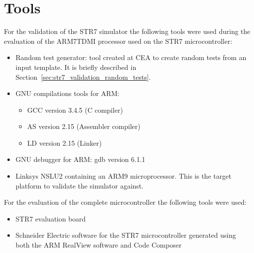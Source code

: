 \section{Tools}
\label{sec:str7_validation_tools}

For the validation of the STR7 simulator the following tools were used during the evaluation of the ARM7TDMI processor used on the STR7 microcontroller:
\begin{itemize}
	\item Random test generator: tool created at CEA to create random tests from an input template. It is briefly described in Section~\ref{sec:str7_validation_random_tests}.
	\item GNU compilations tools for ARM:
	\begin{itemize}
		\item GCC version 3.4.5 (C compiler)
		\item AS version 2.15 (Assembler compiler)
		\item LD version 2.15 (Linker)
	\end{itemize}
	\item GNU debugger for ARM: gdb version 6.1.1
	\item Linksys NSLU2 containing an ARM9 microprocessor. This is the target platform to validate the simulator against.
\end{itemize}

For the evaluation of the complete microcontroller the following tools were used:
\begin{itemize}
	\item STR7 evaluation board
	\item Schneider Electric software for the STR7 microcontroller generated using both the ARM RealView software and Code Composer
\end{itemize}
